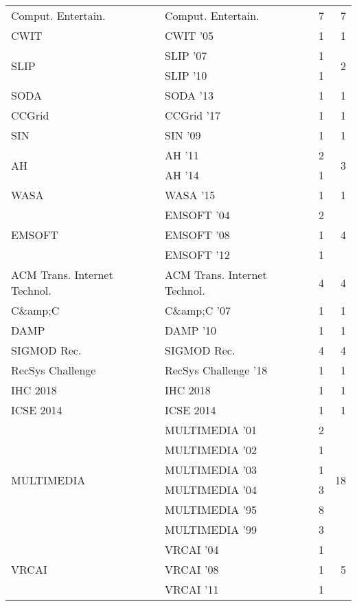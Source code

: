 \begin{table*}[t]
\begin{tabular}{llrr}
\multirow{1}{*}{Comput. Entertain.} & Comput. Entertain. & 7 & \multirow{1}{*}{7}\\
\multirow{1}{*}{CWIT } & CWIT '05 & 1 & \multirow{1}{*}{1}\\
\multirow{2}{*}{SLIP } & SLIP '07 & 1 & \multirow{2}{*}{2}\\
& SLIP '10 & 1 &\\
\multirow{1}{*}{SODA } & SODA '13 & 1 & \multirow{1}{*}{1}\\
\multirow{1}{*}{CCGrid } & CCGrid '17 & 1 & \multirow{1}{*}{1}\\
\multirow{1}{*}{SIN } & SIN '09 & 1 & \multirow{1}{*}{1}\\
\multirow{2}{*}{AH } & AH '11 & 2 & \multirow{2}{*}{3}\\
& AH '14 & 1 &\\
\multirow{1}{*}{WASA } & WASA '15 & 1 & \multirow{1}{*}{1}\\
\multirow{3}{*}{EMSOFT } & EMSOFT '04 & 2 & \multirow{3}{*}{4}\\
& EMSOFT '08 & 1 &\\
& EMSOFT '12 & 1 &\\
\multirow{1}{*}{ACM Trans. Internet Technol.} & ACM Trans. Internet Technol. & 4 & \multirow{1}{*}{4}\\
\multirow{1}{*}{C\&amp;C } & C\&amp;C '07 & 1 & \multirow{1}{*}{1}\\
\multirow{1}{*}{DAMP } & DAMP '10 & 1 & \multirow{1}{*}{1}\\
\multirow{1}{*}{SIGMOD Rec.} & SIGMOD Rec. & 4 & \multirow{1}{*}{4}\\
\multirow{1}{*}{RecSys Challenge } & RecSys Challenge '18 & 1 & \multirow{1}{*}{1}\\
\multirow{1}{*}{IHC 2018} & IHC 2018 & 1 & \multirow{1}{*}{1}\\
\multirow{1}{*}{ICSE 2014} & ICSE 2014 & 1 & \multirow{1}{*}{1}\\
\multirow{6}{*}{MULTIMEDIA } & MULTIMEDIA '01 & 2 & \multirow{6}{*}{18}\\
& MULTIMEDIA '02 & 1 &\\
& MULTIMEDIA '03 & 1 &\\
& MULTIMEDIA '04 & 3 &\\
& MULTIMEDIA '95 & 8 &\\
& MULTIMEDIA '99 & 3 &\\
\multirow{4}{*}{VRCAI } & VRCAI '04 & 1 & \multirow{4}{*}{5}\\
& VRCAI '08 & 1 &\\
& VRCAI '11 & 1 &\\

\end{tabular}
\end{table*}
